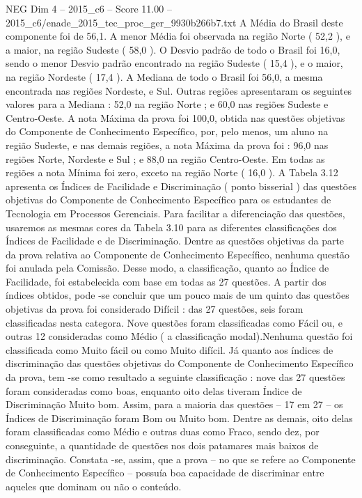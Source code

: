 \begin{textsample}{NEG Dim 4 – 2015\_c6 – Score 11.00 – 2015\_c6/enade\_2015\_tec\_proc\_ger\_9930b266b7.txt}
A Média do Brasil deste componente foi de 56,1.
A menor Média foi observada na região Norte ( 52,2 ), e a maior, na região Sudeste ( 58,0 ).
O Desvio padrão de todo o Brasil foi 16,0, sendo o menor Desvio padrão encontrado na região Sudeste ( 15,4 ), e o maior, na região Nordeste ( 17,4 ).
A Mediana de todo o Brasil foi 56,0, a mesma encontrada nas regiões Nordeste, e Sul.
Outras regiões apresentaram os seguintes valores para a Mediana : 52,0 na região Norte ; e 60,0 nas regiões Sudeste e Centro-Oeste.
A nota Máxima da prova foi 100,0, obtida nas questões objetivas do Componente de Conhecimento Específico, por, pelo menos, um aluno na região Sudeste, e nas demais regiões, a nota Máxima da prova foi : 96,0 nas regiões Norte, Nordeste e Sul ; e 88,0 na região Centro-Oeste.
Em todas as regiões a nota Mínima foi zero, exceto na região Norte ( 16,0 ).
A Tabela 3.12 apresenta os Índices de Facilidade e Discriminação ( ponto bisserial ) das questões objetivas do Componente de Conhecimento Específico para os estudantes de Tecnologia em Processos Gerenciais.
Para facilitar a diferenciação das questões, usaremos as mesmas cores da Tabela 3.10 para as diferentes classificações dos Índices de Facilidade e de Discriminação.
Dentre as questões objetivas da parte da prova relativa ao Componente de Conhecimento Específico, nenhuma questão foi anulada pela Comissão.
Desse modo, a classificação, quanto ao Índice de Facilidade, foi estabelecida com base em todas as 27 questões.
A partir dos índices obtidos, pode -se concluir que um pouco mais de um quinto das questões objetivas da prova foi considerado Difícil : das 27 questões, seis foram classificadas nesta categora.
Nove questões foram classificadas como Fácil ou, e outras 12 consideradas como Médio ( a classificação modal).Nenhuma questão foi classificada como Muito fácil ou como Muito difícil.
Já quanto aos índices de discriminação das questões objetivas do Componente de Conhecimento Específico da prova, tem -se como resultado a seguinte classificação : nove das 27 questões foram consideradas como boas, enquanto oito delas tiveram Índice de Discriminação Muito bom.
Assim, para a maioria das questões – 17 em 27 – os Índices de Discriminação foram Bom ou Muito bom.
Dentre as demais, oito delas foram classificadas como Médio e outras duas como Fraco, sendo dez, por conseguinte, a quantidade de questões nos dois patamares mais baixos de discriminação.
Constata -se, assim, que a prova – no que se refere ao Componente de Conhecimento Específico – possuía boa capacidade de discriminar entre aqueles que dominam ou não o conteúdo.

\end{textsample}
